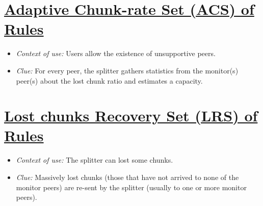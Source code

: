 \documentclass{article}
\begin{document}
\ifx \HCode\Undfef
\else
{}
\fi


\section{\href{http://www.p2psp.org/en/p2psp-protocol?cap=indexsu6.xht\#x14-110004.6}{Adaptive Chunk-rate Set (ACS) of Rules}}

\begin{itemize}
\item \emph{Context of use:} Users allow the existence of unsupportive peers.
\item \emph{Clue:} For every peer, the splitter gathers statistics
  from the monitor(s) peer(s) about the lost chunk ratio and estimates
  a capacity.
\end{itemize}

\ifx \HCode\Undfef
\else
{}
\fi


\section{\href{http://www.p2psp.org/en/p2psp-protocol?cap=indexsu7.xht\#x15-120004.7}{Lost chunks Recovery Set (LRS) of Rules}}

\begin{itemize}
\item \emph{Context of use:} The splitter can lost some chunks.
\item \emph{Clue:} Massively lost chunks (those that have not arrived
  to none of the monitor peers) are re-sent by the splitter (usually
  to one or more monitor peers).
\end{itemize}

\ifx \HCode\Undfef
\else
{}
\fi
\end{document}
